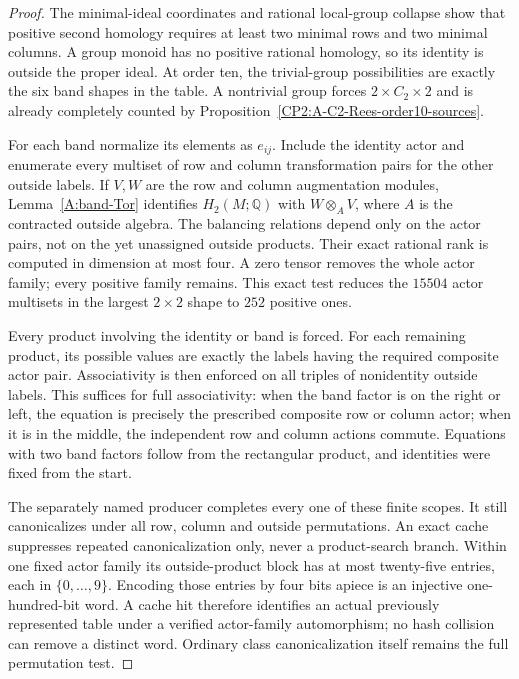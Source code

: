 \begin{proof}
The minimal-ideal coordinates and rational local-group
collapse show that positive second homology requires at
least two minimal rows and two minimal columns. A group
monoid has no positive rational homology, so its identity
is outside the proper ideal. At order ten, the trivial-group
possibilities are exactly the six band shapes in the table.
A nontrivial group forces $2\times C_2\times2$ and is already
completely counted by
Proposition~\ref{CP2:A-C2-Rees-order10-sources}.

For each band normalize its elements as $e_{ij}$. Include
the identity actor and enumerate every multiset of row and
column transformation pairs for the other outside labels.
If $V,W$ are the row and column augmentation modules,
Lemma~\ref{A:band-Tor} identifies $H_2(M;\mathbb Q)$ with
$W\otimes_A V$, where $A$ is the contracted outside algebra.
The balancing relations depend only on the actor pairs,
not on the yet unassigned outside products. Their exact
rational rank is computed in dimension at most four.
A zero tensor removes the whole actor family; every
positive family remains. This exact test reduces the
$15504$ actor multisets in the largest $2\times2$ shape
to $252$ positive ones.

Every product involving the identity or band is forced.
For each remaining product, its possible values are exactly
the labels having the required composite actor pair.
Associativity is then enforced on all triples of nonidentity
outside labels. This suffices for full associativity:
when the band factor is on the right or left, the equation
is precisely the prescribed composite row or column actor;
when it is in the middle, the independent row and column
actions commute. Equations with two band factors follow
from the rectangular product, and identities were fixed
from the start.

The separately named producer
 completes
every one of these finite scopes. It still canonicalizes
under all row, column and outside permutations. An exact
cache suppresses repeated canonicalization only, never a
product-search branch. Within one fixed actor family its
outside-product block has at most twenty-five entries,
each in $\{0,\ldots,9\}$. Encoding those entries by four
bits apiece is an injective one-hundred-bit word. A cache
hit therefore identifies an actual previously represented
table under a verified actor-family automorphism; no hash
collision can remove a distinct word. Ordinary class
canonicalization itself remains the full permutation test.


\end{proof}
